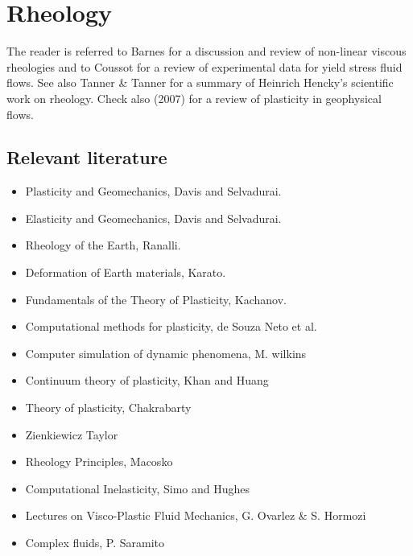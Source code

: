 \chapter{Rheology}

The reader is referred to Barnes \cite{barn99}
for a discussion and review of non-linear viscous rheologies and 
to Coussot \cite{cous14} for a review of experimental data for yield stress fluid
flows. See also Tanner \& Tanner \cite{tata03} for a summary of Heinrich Hencky's 
scientific work on rheology.
Check also \textcite{ance07} (2007) for a review of plasticity in geophysical flows. 

\section{Relevant literature}

\begin{itemize}
\item Plasticity and Geomechanics, Davis and Selvadurai. \cite{dase02}
\item Elasticity and Geomechanics, Davis and Selvadurai. \cite{dase96}
\item Rheology of the Earth, Ranalli. \cite{ranalli}
\item Deformation of Earth materials, Karato. \cite{kara08}
\item Fundamentals of the Theory of Plasticity, Kachanov. \cite{kacha04} 
\item Computational methods for plasticity, de Souza Neto et al. \cite{depo}
\item Computer simulation of dynamic phenomena, M. wilkins \cite{wilk}
\item Continuum theory of plasticity, Khan and Huang \cite{khhu}
\item Theory of plasticity, Chakrabarty \cite{chakrabarty}
\item Zienkiewicz Taylor \cite{zita2}
\item Rheology Principles, Macosko \cite{macosko}
\item Computational Inelasticity, Simo and Hughes \cite{simohughes} 
\item Lectures on Visco-Plastic Fluid Mechanics, G. Ovarlez \& S. Hormozi \cite{ovho19}
\item Complex fluids, P. Saramito \cite{saramito}
\end{itemize}




